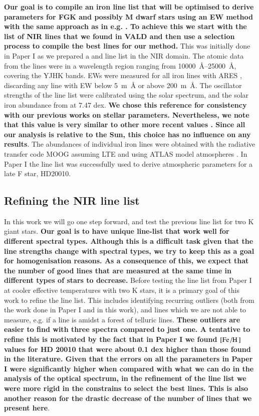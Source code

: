 \documentclass{aa}
\begin{document}
{\bf Our goal is to compile an iron line list that will be optimised to derive parameters for FGK
and possibly M dwarf stars using an EW method with the same approach as in e.g. \citet{Sousa2008a}.
To achieve this we start with the list of NIR lines that we found in VALD \citep{VALD1,VALD2} and
then use a selection process to compile the best lines for our method.} This was initially done in
Paper I as we prepared a  and  line list in the NIR domain. The atomic data
from the lines were in a wavelength region ranging from \SIrange{10000}{25000}{\AA}, covering the
YJHK bands. EWs were measured for all iron lines with ARES \citep{Sousa2015a}, discarding any line
with EW below \SI{5}{m\AA} or above \SI{200}{m\AA}. The oscillator strengths of the line list were
calibrated using the solar spectrum, and the solar iron abundance from \citet{Gonzalez2000} at 7.47
dex. {\bf We chose this reference for consistency with our previous works on stellar parameters.
Nevertheless, we note that this value is very similar to other more recent values
\citep[e.g.][]{Asplund2009}. Since all our analysis is relative to the Sun, this choice has no
influence on any results}. The abundances of individual iron lines were obtained with the radiative
transfer code MOOG \citep{Sneden1973} assuming LTE and using ATLAS model atmospheres
\citep{Kurucz1993}. In Paper I the line list was successfully used to derive atmospheric parameters
for a late F star, HD20010.


\subsection{Refining the NIR line list}
\label{sec:refining_the_line_list}

In this work we will go one step forward, and test the previous line list for two K giant stars.
{\bf Our goal is to have unique line-list that work well for different spectral types. Although this
is a difficult task given that the line strengths change with spectral types, we try to keep this as
a goal for homogenisation reasons. As a consequence of this, we expect that the number of good lines
that are measured at the same time in different types of stars to decrease.} Before testing the line
list from Paper I at cooler effective temperatures with two K stars, it is a primary goal of this
work to refine the line list. This includes identifying recurring outliers (both from the work done
in Paper I and in this work), and lines which we are not able to measure, e.g. if a line is amidst a
forest of telluric lines. {\bf These outliers are easier to find with three spectra compared to just
one. A tentative to refine this is motivated by the fact that in Paper I we found
$[\ion{Fe}/\ion{H}]$ values for HD 20010 that were about 0.1 dex higher than those found in the
literature. Given that the errors on all the parameters in Paper I were significantly higher when
compared with what we can do in the analysis of the optical spectrum, in the refinement of the line
list we were more rigid in the constrains to select the best lines. This is also another reason for
the drastic decrease of the number of lines that we present here}.
\end{document}

